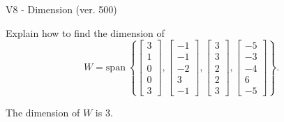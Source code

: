 \begin{exercise}
  \begin{exerciseTitle}V8 - Dimension (ver. 500)\end{exerciseTitle}
  \begin{exerciseStatement}
    Explain how to find the dimension of 
\[W=\mathrm{span}\ \left\{\left[\begin{array}{r}
3 \\
1 \\
0 \\
0 \\
3
\end{array}\right] , \left[\begin{array}{r}
-1 \\
-1 \\
-2 \\
3 \\
-1
\end{array}\right] , \left[\begin{array}{r}
3 \\
3 \\
2 \\
2 \\
3
\end{array}\right] , \left[\begin{array}{r}
-5 \\
-3 \\
-4 \\
6 \\
-5
\end{array}\right]\right\}.\]



  \end{exerciseStatement}
  \begin{exerciseAnswer}
   The dimension of \(W\) is  \(3\).
  


  \end{exerciseAnswer}
\end{exercise}